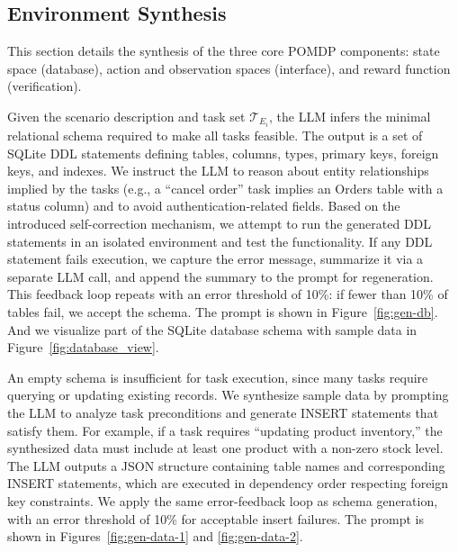 \subsection{Environment Synthesis} \label{appendix:environment_synthesis}

This section details the synthesis of the three core POMDP components: state space (database), action and observation spaces (interface), and reward function (verification).

Given the scenario description and task set $\mathcal{T}_{E_i}$, the LLM infers the minimal relational schema required to make all tasks feasible.
The output is a set of SQLite DDL statements defining tables, columns, types, primary keys, foreign keys, and indexes.
We instruct the LLM to reason about entity relationships implied by the tasks (e.g., a ``cancel order'' task implies an Orders table with a status column) and to avoid authentication-related fields.
Based on the introduced self-correction mechanism, we attempt to run the generated DDL statements in an isolated environment and test the functionality.
If any DDL statement fails execution, we capture the error message, summarize it via a separate LLM call, and append the summary to the prompt for regeneration.
This feedback loop repeats with an error threshold of 10\%: if fewer than 10\% of tables fail, we accept the schema.
The prompt is shown in Figure~\ref{fig:gen-db}. And we visualize part of the SQLite database schema with sample data in Figure~\ref{fig:database_view}.

An empty schema is insufficient for task execution, since many tasks require querying or updating existing records.
We synthesize sample data by prompting the LLM to analyze task preconditions and generate INSERT statements that satisfy them.
For example, if a task requires ``updating product inventory,'' the synthesized data must include at least one product with a non-zero stock level.
The LLM outputs a JSON structure containing table names and corresponding INSERT statements, which are executed in dependency order respecting foreign key constraints.
We apply the same error-feedback loop as schema generation, with an error threshold of 10\% for acceptable insert failures.
The prompt is shown in Figures~\ref{fig:gen-data-1} and \ref{fig:gen-data-2}. 

